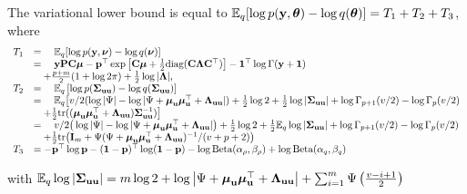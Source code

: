 \documentclass{amsart}[12pt]
\begin{document}
			The variational lower bound is equal to ${\mathbb E}_q[\log{p({\bf y}, {\boldsymbol\theta})} - \log{q({\boldsymbol\theta})}] = T_1 + T_2 + T_3$,
			where
			$$
			\begin{array}{rl}
				T_1 & = \quad {\mathbb E}_q[\log{p({\bf y}, {\boldsymbol\nu})} - \log{q({\boldsymbol\nu})}]                                                                                                                                                  \\
				    & = \quad {\bf y} {\bf P} {\bf C} {\boldsymbol\mu} - {\bf p}^\top \exp{\left[ {\bf C}{\boldsymbol\mu}+  \tfrac{1}{2} \text{diag} ({\bf C}{\boldsymbol\Lambda}{\bf C}^\top) \right]} - {\bf 1}^\top\log \Gamma{({\bf y}+ {\bf1})}                                               \\
				    & \quad + \frac{p + m}{2} (1 + \log{2 \pi}) + \tfrac{1}{2} \log{|{\boldsymbol\Lambda}|},                                                                                                                                \\
				T_2 & = \quad {\mathbb E}_q \left[ \log p({\boldsymbol \Sigma}_{{\bf u} {\bf u}}) - \log q({\boldsymbol \Sigma}_{{\bf u} {\bf u}}) \right]                                                                                                                 \\
				    & = \quad {\mathbb E}_q \big[ v/2(\log |\Psi| - \log |\Psi + {\boldsymbol \mu}_{\bf u} {\boldsymbol \mu}_{\bf u}^\top + {\boldsymbol \Lambda}_{{\bf u} {\bf u}}|) + \tfrac{1}{2} \log 2 + \tfrac{1}{2} \log|{\boldsymbol \Sigma}_{{\bf u} {\bf u}}| + \log \Gamma_{p+1}(v/2) - \log \Gamma_{p}(v/2)    \\
				    & \quad + \tfrac{1}{2} \text{tr}(({\boldsymbol \mu}_{{\bf u}} {\boldsymbol \mu}_{{\bf u}}^\top + {\boldsymbol \Lambda}_{{\bf u} {\bf u}}) {\boldsymbol \Sigma}_{{\bf u} {\bf u}}^{-1}) \big]                                                                                                  \\
				    & = \quad v/2\big(\log |\Psi| - \log |\Psi + {\boldsymbol \mu}_{\bf u} {\boldsymbol \mu}_{\bf u}^\top + {\boldsymbol \Lambda}_{{\bf u} {\bf u}}|\big) + \tfrac{1}{2} \log 2 + \tfrac{1}{2} {\mathbb E}_q \log |{\boldsymbol \Sigma}_{{\bf u} {\bf u}}| + \log \Gamma_{p+1}(v/2) - \log \Gamma_{p}(v/2) \\
				    & \quad + \tfrac{1}{2} \text{tr}\big({\bf I}_m + \Psi(\Psi+ {\boldsymbol \mu}_{\bf u} {\boldsymbol \mu}_{\bf u}^\top + {\boldsymbol \Lambda}_{{\bf u} {\bf u}})^{-1}/(v + p + 2)\big)                                                                                        \\
				T_3 & = - {\bf p}^\top \log {\bf p} - ({\bf 1} - {\bf p})^\top \log ({\bf 1} - {\bf p}) - \log \text{Beta} (\alpha_\rho, \beta_\rho) + \log \text{Beta} (\alpha_q, \beta_q)                                                              
			\end{array}
			$$
					
			\noindent with ${\mathbb E}_q \log |{\boldsymbol \Sigma}_{{\bf u} {\bf u}}| = m \log 2 + \log \left | \Psi + {\boldsymbol \mu}_{\bf u} {\boldsymbol \mu}_{\bf u}^\top + {\boldsymbol \Lambda}_{{\bf u} {\bf u}} \right | + \sum_{i=1}^m \Psi \left ( \frac{v - i + 1}{2} \right )$
					
			
			
					
\end{document}
